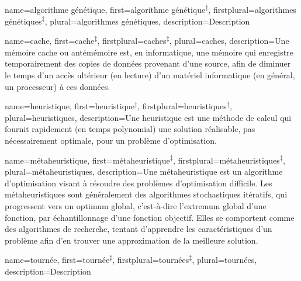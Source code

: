 {
	name={algorithme génétique},
	first={algorithme génétique}\textsuperscript{$\ddagger$}, %
	firstplural={algorithmes génétiques}\textsuperscript{$\ddagger$},
	plural={algorithmes génétiques},
	description={Description}%
}


{
	name=cache,
	first=cache\textsuperscript{$\ddagger$}, %
	firstplural=caches\textsuperscript{$\ddagger$},
	plural=caches,
	description={Une mémoire cache ou antémémoire est, en informatique, une mémoire qui enregistre temporairement des copies de données provenant d'une source, afin de diminuer le temps d'un accès ultérieur (en lecture) d'un matériel informatique (en général, un processeur) à ces données. \cite{wikipedia-cache}}%
}

{
	name={heuristique},
	first={heuristique}\textsuperscript{$\ddagger$}, %
	firstplural={heuristiques}\textsuperscript{$\ddagger$},
	plural={heuristiques},
	description={Une heuristique est une méthode de calcul qui fournit rapidement (en temps polynomial) une solution réalisable, pas nécessairement optimale, pour un problème d'optimisation.}%
}

{
	name={métaheuristique},
	first={métaheuristique}\textsuperscript{$\ddagger$}, %
	firstplural={métaheuristiques}\textsuperscript{$\ddagger$},
	plural={métaheuristiques},
	description={Une métaheuristique est un algorithme d’optimisation visant à résoudre des problèmes d’optimisation difficile. Les métaheuristiques sont généralement des algorithmes stochastiques itératifs, qui progressent vers un optimum global, c'est-à-dire l'extremum global d'une fonction, par échantillonnage d’une fonction objectif. Elles se comportent comme des algorithmes de recherche, tentant d’apprendre les caractéristiques d’un problème afin d’en trouver une approximation de la meilleure solution.}%
}



{
	name={tournée},
	first={tournée}\textsuperscript{$\ddagger$}, %
	firstplural={tournées}\textsuperscript{$\ddagger$},
	plural={tournées},
	description={Description}%
}

